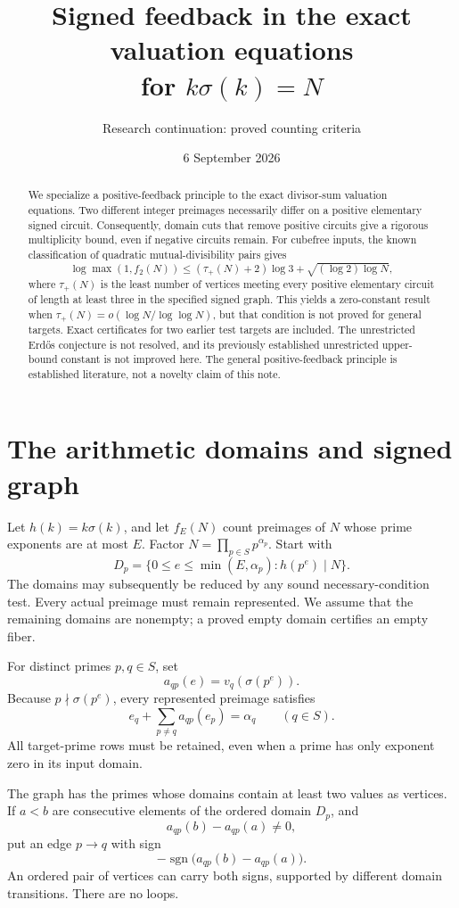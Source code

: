 \documentclass[11pt]{article}
\title{Signed feedback in the exact valuation equations\\for \texorpdfstring{$k\sigma(k)=N$}{k sigma(k)=N}}
\author{Research continuation: proved counting criteria}
\date{6 September 2026}
\DeclareMathOperator{\sgn}{sgn}
\begin{document}
\maketitle
\begin{abstract}
We specialize a positive-feedback principle to the exact divisor-sum valuation equations. Two different integer preimages necessarily differ on a positive elementary signed circuit. Consequently, domain cuts that remove positive circuits give a rigorous multiplicity bound, even if negative circuits remain. For cubefree inputs, the known classification of quadratic mutual-divisibility pairs gives
\[
\log\max(1,f_2(N))\le (\tau_+(N)+2)\log3+\sqrt{(\log2)\log N},
\]
where $\tau_+(N)$ is the least number of vertices meeting every positive elementary circuit of length at least three in the specified signed graph. This yields a zero-constant result when $\tau_+(N)=o(\log N/\log\log N)$, but that condition is not proved for general targets. Exact certificates for two earlier test targets are included. The unrestricted Erd\H{o}s conjecture is not resolved, and its previously established unrestricted upper-bound constant is not improved here. The general positive-feedback principle is established literature, not a novelty claim of this note.
\end{abstract}

\section{The arithmetic domains and signed graph}
Let $h(k)=k\sigma(k)$, and let $f_E(N)$ count preimages of $N$ whose prime exponents are at most $E$. Factor $N=\prod_{p\in S}p^{\alpha_p}$. Start with
\[
 D_p=\{0\le e\le\min(E,\alpha_p):h(p^e)\mid N\}.
\]
The domains may subsequently be reduced by any sound necessary-condition test. Every actual preimage must remain represented. We assume that the remaining domains are nonempty; a proved empty domain certifies an empty fiber.

For distinct primes $p,q\in S$, set
\[
 a_{qp}(e)=v_q(\sigma(p^e)).
\]
Because $p\nmid\sigma(p^e)$, every represented preimage satisfies
\begin{equation}\label{eq:rows}
 e_q+\sum_{p\ne q}a_{qp}(e_p)=\alpha_q\qquad(q\in S).
\end{equation}
All target-prime rows must be retained, even when a prime has only exponent zero in its input domain.

The graph has the primes whose domains contain at least two values as vertices. If $a<b$ are consecutive elements of the ordered domain $D_p$, and
\[
 a_{qp}(b)-a_{qp}(a)\ne0,
\]
put an edge $p\to q$ with sign
\begin{equation}\label{eq:edge}
 -\sgn\bigl(a_{qp}(b)-a_{qp}(a)\bigr).
\end{equation}
An ordered pair of vertices can carry both signs, supported by different domain transitions. There are no loops.
\end{document}
